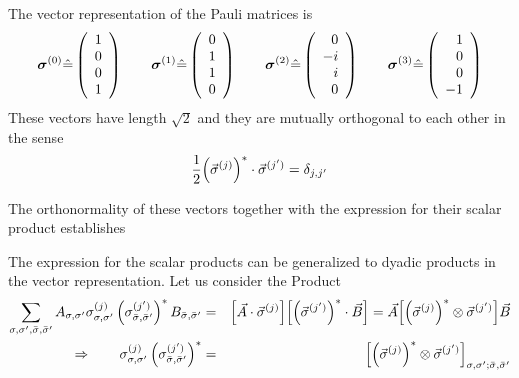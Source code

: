 \documentclass[11pt,a4paper]{report}
\begin{document}
The vector representation of the  Pauli matrices is
\begin{eqnarray*}
\bm{\sigma}^{(0)}\hat{=}
\left(\begin{array}{c}1\\0\\0\\1\end{array}\right)
\qquad
\bm{\sigma}^{(1)}\hat{=}
\left(\begin{array}{c}0\\1\\1\\0\end{array}\right)
\qquad
\bm{\sigma}^{(2)}\hat{=}
\left(\begin{array}{r}0\\-i\\i\\0\end{array}\right)
\qquad
\bm{\sigma}^{(3)}\hat{=}
\left(\begin{array}{r}1\\0\\0\\-1\end{array}\right)
\end{eqnarray*}
These vectors have length $\sqrt{2}$ and they are mutually orthogonal
to each other in the sense
\begin{eqnarray}
\frac{1}{2}\Bigl(\vec{\sigma}^{(j)}\Bigr)^*\cdot\vec{\sigma}^{(j')}=\delta_{j,j'}
\label{eq:pauliorthonormality1}
\end{eqnarray}

The orthonormality  of these vectors
together with the expression
 for their
scalar product establishes\\

The expression for the scalar products can be generalized to dyadic
products in the vector representation.
Let us consider the Product
\begin{eqnarray}
\sum_{\sigma,\sigma',\bar{\sigma},\bar{\sigma}'} 
A_{\sigma,\sigma'} \sigma^{(j)}_{\sigma,\sigma'}
\left(\sigma^{(j')}_{\bar{\sigma},\bar{\sigma}'} \right)^*
B_{\bar{\sigma},\bar{\sigma}'} 
&=&\Bigl[\vec{A}\cdot\vec{\sigma}^{(j)}\Bigr]
\Bigl[\Bigl(\vec{\sigma}^{(j')}\Bigr)^*\cdot\vec{B}\Bigr]
=\vec{A}\Bigl[\Bigl(\vec{\sigma}^{(j)}\Bigr)^*\otimes\vec{\sigma}^{(j')}\Bigr]\vec{B}
\nonumber\\
\Rightarrow\qquad\sigma^{(j)}_{\sigma,\sigma'}
\left(\sigma^{(j')}_{\bar{\sigma},\bar{\sigma}'} \right)^*
&=&\Bigl[\Bigl(\vec{\sigma}^{(j)}\Bigr)^*\otimes\vec{\sigma}^{(j')}\Bigr]
_{\sigma,\sigma';\bar{\sigma},\bar{\sigma}'}
\label{eq:paulivectorrepresentationmeaningouterproduct}
\end{eqnarray}
\end{document}
